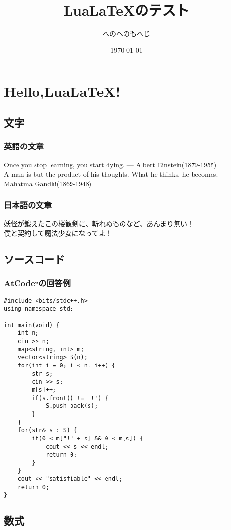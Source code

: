 \documentclass[report,a4paper,titlepage]{jlreq}
\begin{document}
\title{Lua\LaTeX のテスト}
\author{へのへのもへじ}
\date{\today}
\maketitle

\chapter{Hello,Lua\LaTeX !}
\section{文字}
\subsection{英語の文章}
\noindent
Once you stop learning, you start dying. --- Albert Einstein(1879-1955)\\
\textsf{A man is but the product of his thoughts. What he thinks, he becomes.
    ---　Mahatma Gandhi(1869-1948)}
\subsection{日本語の文章}
\noindent
妖怪が鍛えたこの楼観剣に、斬れぬものなど、あんまり無い！\\
{\sffamily 僕と契約して魔法少女になってよ！}\\

\section{ソースコード}
\subsection{AtCoderの回答例}
\begin{lstlisting}[caption = ABC187 C問題回答例(C++)]
#include <bits/stdc++.h>
using namespace std;

int main(void) {
	int n;
	cin >> n;
	map<string, int> m;
	vector<string> S(n);
	for(int i = 0; i < n, i++) {
		str s;
		cin >> s;
		m[s]++;
		if(s.front() != '!') {
			S.push_back(s);
		}
	}
	for(str& s : S) {
		if(0 < m["!" + s] && 0 < m[s]) {
			cout << s << endl;
			return 0;
		}
	}
	cout << "satisfiable" << endl;
	return 0;
}
\end{lstlisting}

\section{数式}
\end{document}
